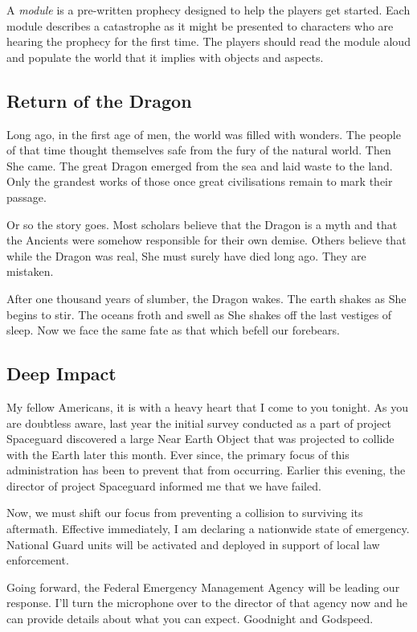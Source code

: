\documentclass[12pt, a5paper, parskip=half-]{scrartcl}
\begin{document}
A \emph{module} is a pre-written prophecy designed to help the players get started.
Each module describes a catastrophe as it might be presented to characters who are hearing the prophecy for the first time.  The players should read the module aloud and populate the world that it implies with objects and aspects.

\subsection*{Return of the Dragon}
Long ago, in the first age of men, the world was filled with wonders. 
The people of that time thought themselves safe from the fury of the natural world.
Then She came.
The great Dragon emerged from the sea and laid waste to the land.
Only the grandest works of those once great civilisations remain to mark their passage.

Or so the story goes.
Most scholars believe that the Dragon is a myth and that the Ancients were somehow responsible for their own demise.
Others believe that while the Dragon was real, She must surely have died long ago.
They are mistaken. 

After one thousand years of slumber, the Dragon wakes. 
The earth shakes as She begins to stir.
The oceans froth and swell as She shakes off the last vestiges of sleep.
Now we face the same fate as that which befell our forebears.

\newpage

\subsection*{Deep Impact}
My fellow Americans, it is with a heavy heart that I come to you tonight. 
As you are doubtless aware, last year the initial survey conducted as a part of project Spaceguard discovered a large Near Earth Object that was projected to collide with the Earth later this month.
Ever since, the primary focus of this administration has been to prevent that from occurring. Earlier this evening, the director of project Spaceguard informed me that we have failed.

Now, we must shift our focus from preventing a collision to surviving its aftermath.
Effective immediately, I am declaring a nationwide state of emergency. 
National Guard units will be activated and deployed in support of local law enforcement. 

Going forward, the Federal Emergency Management Agency will be leading our response.
I'll turn the microphone over to the director of that agency now and he can provide details about what you can expect.
Goodnight and Godspeed.
\end{document}
